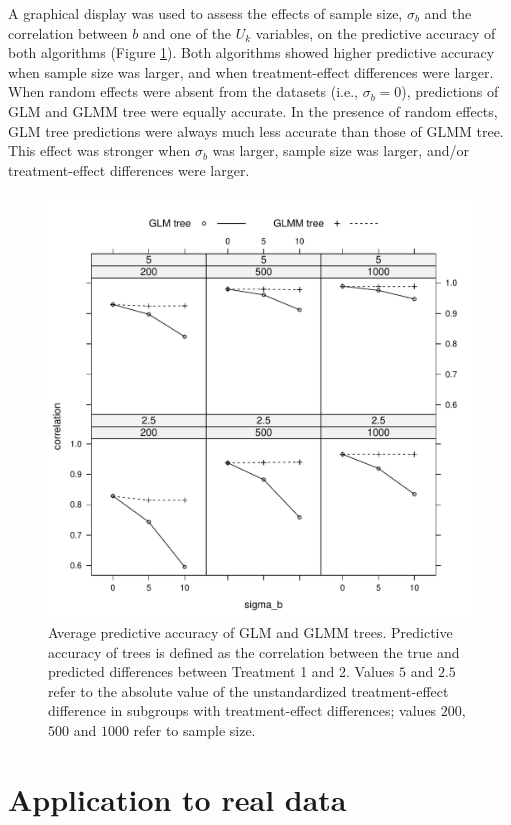 \documentclass[nobf,doc]{apa}
\begin{document}
A graphical display was used to assess the effects of sample size, $\sigma_b$ and the correlation between $b$ and one of the $U_k$ variables, on the predictive accuracy of both algorithms (Figure \ref{fig:xyplot_correlations}). Both algorithms showed higher predictive accuracy when sample size was larger, and when treatment-effect differences were larger. When random effects were absent from the datasets (i.e., $\sigma_b = 0$), predictions of GLM and GLMM tree were equally accurate. In the presence of random effects, GLM tree predictions were always much less accurate than those of GLMM tree. This effect was stronger when $\sigma_b$ was larger, sample size was larger, and/or treatment-effect differences were larger.

\begin{figure}[!htbp]
	\includegraphics[width=12cm]{xy_correlations.pdf}
	\caption{Average predictive accuracy of GLM and GLMM trees. Predictive accuracy of trees is defined as the correlation between the true and predicted differences between Treatment 1 and 2. Values $5$ and $2.5$ refer to the absolute value of the unstandardized treatment-effect difference in subgroups with treatment-effect differences; values $200$, $500$ and $1000$ refer to sample size.}
	\label{fig:xyplot_correlations}
\end{figure}



\section{Application to real data}
\end{document}
